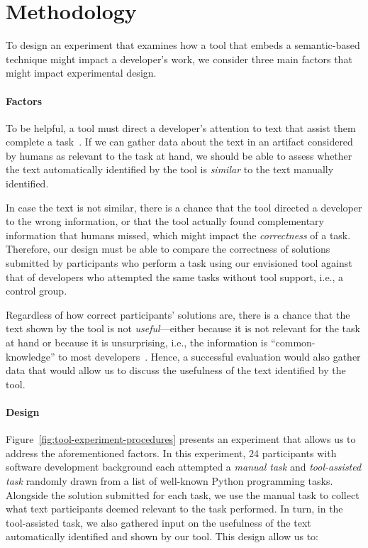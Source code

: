


\section{Methodology}
\label{cp6:method}


To design an experiment
that examines how a tool that embeds a semantic-based technique might impact a developer's work,
we consider three main factors that might impact experimental design.




\paragraph{\textbf{Factors}}



To be helpful, a tool must direct a developer's attention to text that assist them complete a task~\cite{Robillard2015}. If we can gather data about the text in an artifact considered by humans as relevant to the task at hand, we should be able to assess whether the text automatically identified by the tool is \textit{similar} to the text manually identified. 


In case the text is not similar,
there is a chance that the tool directed a developer to the wrong information, or that 
the tool actually found complementary information that humans missed, which might impact the \textit{correctness} of a task. Therefore, our design must be able to compare the correctness of solutions submitted by participants who perform a task using our envisioned tool against that of developers who attempted the same tasks without tool support, i.e., a control group.


Regardless of how correct participants' solutions are, there is a chance that the text shown by the tool is not \textit{useful}---either because it is not relevant for the task at hand or because it is unsurprising, i.e., the information is ``common-knowledge'' to most developers~\cite{cwalina2008, Robillard2015}. Hence, a successful evaluation would 
also gather data that would allow us to discuss the usefulness of the text identified by the tool. 




\paragraph{\textbf{Design}}




Figure~\ref{fig:tool-experiment-procedures} presents an experiment that allows us to address the aforementioned factors. In this experiment, 24 participants with software development background each attempted a
\textit{manual task} and \textit{tool-assisted task} randomly drawn from a list of well-known Python programming tasks.
Alongside the solution submitted for each task, we use the manual task to collect what text participants deemed relevant to the task performed.
In turn, in the tool-assisted task, we also gathered input on the usefulness of the text automatically identified and shown by our tool. 
This design allow us to:




